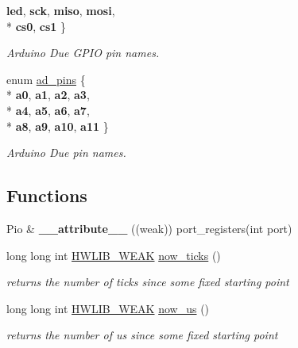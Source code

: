 \begin{DoxyCompactItemize}
{\bfseries led}, 
{\bfseries sck}, 
{\bfseries miso}, 
{\bfseries mosi}, 
\\*
{\bfseries cs0}, 
{\bfseries cs1}
 \}\begin{DoxyCompactList}\small\item\em Arduino Due G\+P\+IO pin names. \end{DoxyCompactList}
\item 
enum \hyperlink{namespacedue_a5ecc98d40585c91eabbfb14f71bd7d4c}{ad\+\_\+pins} \{ \\*
{\bfseries a0}, 
{\bfseries a1}, 
{\bfseries a2}, 
{\bfseries a3}, 
\\*
{\bfseries a4}, 
{\bfseries a5}, 
{\bfseries a6}, 
{\bfseries a7}, 
\\*
{\bfseries a8}, 
{\bfseries a9}, 
{\bfseries a10}, 
{\bfseries a11}
 \}\begin{DoxyCompactList}\small\item\em Arduino Due pin names. \end{DoxyCompactList}
\end{DoxyCompactItemize}
\subsection*{Functions}
\begin{DoxyCompactItemize}
\item 
Pio \& {\bfseries \+\_\+\+\_\+attribute\+\_\+\+\_\+} ((weak)) port\+\_\+registers(int port)\hypertarget{namespacedue_a691468d1eaea9eb36a06b94e7c27d6fa}{}\label{namespacedue_a691468d1eaea9eb36a06b94e7c27d6fa}

\item 
long long int \hyperlink{hwlib-defines_8hpp_a04be4340016df60d6636c1d1c6d94fc9}{H\+W\+L\+I\+B\+\_\+\+W\+E\+AK} \hyperlink{namespacedue_aed372aa18d1261d874f74642952d4b53}{now\+\_\+ticks} ()\hypertarget{namespacedue_aed372aa18d1261d874f74642952d4b53}{}\label{namespacedue_aed372aa18d1261d874f74642952d4b53}

\begin{DoxyCompactList}\small\item\em returns the number of ticks since some fixed starting point \end{DoxyCompactList}\item 
long long int \hyperlink{hwlib-defines_8hpp_a04be4340016df60d6636c1d1c6d94fc9}{H\+W\+L\+I\+B\+\_\+\+W\+E\+AK} \hyperlink{namespacedue_a763b16adccc73515e1d463402e05fd52}{now\+\_\+us} ()\hypertarget{namespacedue_a763b16adccc73515e1d463402e05fd52}{}\label{namespacedue_a763b16adccc73515e1d463402e05fd52}

\begin{DoxyCompactList}\small\item\em returns the number of us since some fixed starting point \end{DoxyCompactList}\end{DoxyCompactItemize}
